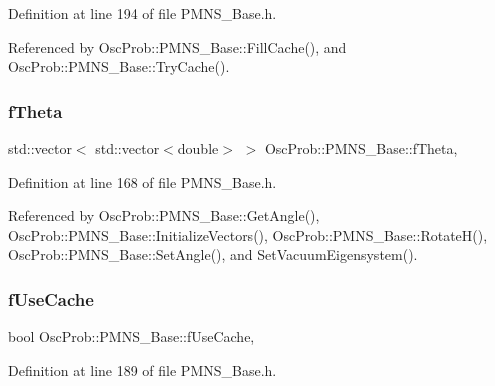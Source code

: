 Definition at line 194 of file P\+M\+N\+S\+\_\+\+Base.\+h.



Referenced by Osc\+Prob\+::\+P\+M\+N\+S\+\_\+\+Base\+::\+Fill\+Cache(), and Osc\+Prob\+::\+P\+M\+N\+S\+\_\+\+Base\+::\+Try\+Cache().

\mbox{\label{classOscProb_1_1PMNS__Base_a1976887cd658dd86b2336c181f1470b4}} 
\subsubsection{\texorpdfstring{f\+Theta}{fTheta}}
{\footnotesize\ttfamily std\+::vector$<$ std\+::vector$<$double$>$ $>$ Osc\+Prob\+::\+P\+M\+N\+S\+\_\+\+Base\+::f\+Theta\hspace{0.3cm}{\ttfamily [protected]}, {\ttfamily [inherited]}}



Definition at line 168 of file P\+M\+N\+S\+\_\+\+Base.\+h.



Referenced by Osc\+Prob\+::\+P\+M\+N\+S\+\_\+\+Base\+::\+Get\+Angle(), Osc\+Prob\+::\+P\+M\+N\+S\+\_\+\+Base\+::\+Initialize\+Vectors(), Osc\+Prob\+::\+P\+M\+N\+S\+\_\+\+Base\+::\+Rotate\+H(), Osc\+Prob\+::\+P\+M\+N\+S\+\_\+\+Base\+::\+Set\+Angle(), and Set\+Vacuum\+Eigensystem().

\mbox{\label{classOscProb_1_1PMNS__Base_ad28c12ef897b5555eda509ea55c99107}} 
\subsubsection{\texorpdfstring{f\+Use\+Cache}{fUseCache}}
{\footnotesize\ttfamily bool Osc\+Prob\+::\+P\+M\+N\+S\+\_\+\+Base\+::f\+Use\+Cache\hspace{0.3cm}{\ttfamily [protected]}, {\ttfamily [inherited]}}



Definition at line 189 of file P\+M\+N\+S\+\_\+\+Base.\+h.



